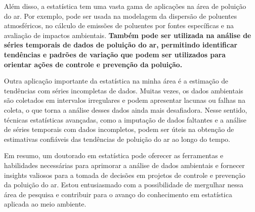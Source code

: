 \documentclass[12pt,a4paper]{article}
\begin{document}
	Além disso, a estatística tem uma vasta gama de aplicações na área de poluição do ar. Por exemplo, pode ser usada na modelagem da dispersão de poluentes atmosféricos, no cálculo de emissões de poluentes por fontes específicas e na avaliação de impactos ambientais. \textbf{Também pode ser utilizada na análise de séries temporais de dados de poluição do ar, permitindo identificar tendências e padrões de variação que podem ser utilizados para orientar ações de controle e prevenção da poluição.}
	
	Outra aplicação importante da estatística na minha área é a estimação de tendências com séries incompletas de dados. Muitas vezes, os dados ambientais são coletados em intervalos irregulares e podem apresentar lacunas ou falhas na coleta, o que torna a análise desses dados ainda mais desafiadora. Nesse sentido, técnicas estatísticas avançadas, como a imputação de dados faltantes e a análise de séries temporais com dados incompletos, podem ser úteis na obtenção de estimativas confiáveis das tendências de poluição do ar ao longo do tempo.
	
	Em resumo, um doutorado em estatística pode oferecer as ferramentas e habilidades necessárias para aprimorar a análise de dados ambientais e fornecer insights valiosos para a tomada de decisões em projetos de controle e prevenção da poluição do ar. Estou entusiasmado com a possibilidade de mergulhar nessa área de pesquisa e contribuir para o avanço do conhecimento em estatística aplicada ao meio ambiente.
	
	\label{LastPage}
\end{document}
